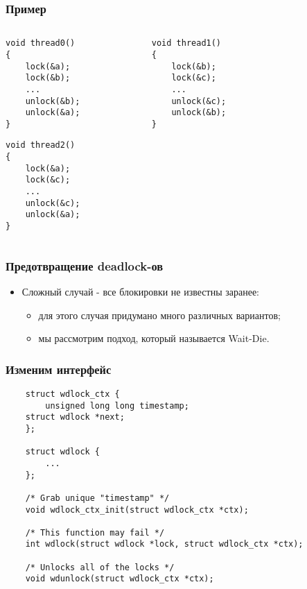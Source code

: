 \begin{frame}[fragile]
\frametitle{Пример}
\begin{columns}
    \begin{column}{.35\linewidth}
        \begin{lstlisting}
void thread0()
{
    lock(&a);
    lock(&b);
    ...
    unlock(&b);
    unlock(&a);
}
        \end{lstlisting}
        \begin{lstlisting}
void thread2()
{
    lock(&a);
    lock(&c);
    ...
    unlock(&c);
    unlock(&a);
}
        \end{lstlisting}
    \end{column}
    \begin{column}{.35\linewidth}
        \begin{lstlisting}
void thread1()
{
    lock(&b);
    lock(&c);
    ...
    unlock(&c);
    unlock(&b);
}
        \end{lstlisting}
    \end{column}
    \begin{column}{.3\linewidth}
    \end{column}
\end{columns}
\end{frame}

\begin{frame}
\frametitle{Предотвращение deadlock-ов}
\begin{itemize}
    \item<1->Сложный случай - все блокировки не известны заранее:
    \begin{itemize}
        \item<2->для этого случая придумано много различных вариантов;
        \item<3->мы рассмотрим подход, который называется Wait-Die.
    \end{itemize}
\end{itemize}
\end{frame}

\begin{frame}[fragile]
\frametitle{Изменим интерфейс}
\begin{lstlisting}
    struct wdlock_ctx {
        unsigned long long timestamp;
	struct wdlock *next;
    };

    struct wdlock {
        ...
    };

    /* Grab unique "timestamp" */
    void wdlock_ctx_init(struct wdlock_ctx *ctx);

    /* This function may fail */
    int wdlock(struct wdlock *lock, struct wdlock_ctx *ctx);

    /* Unlocks all of the locks */
    void wdunlock(struct wdlock_ctx *ctx);
\end{lstlisting}
\end{frame}

